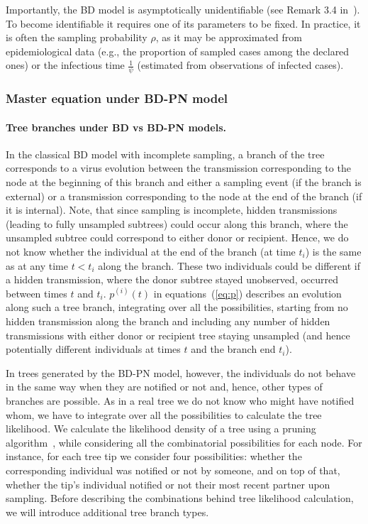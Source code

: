 \documentclass[10pt,letterpaper]{article}
\begin{document}
Importantly, the BD model is asymptotically unidentifiable (see Remark 3.4 in~\cite{Stadler2009}). To become identifiable it requires one of its parameters to be fixed. In practice, it is often the sampling probability $\rho$, as it may be approximated from epidemiological data (e.g., the proportion of sampled cases among the declared ones) or the infectious time $\frac{1}{\psi}$ (estimated from observations of infected cases). 

\subsubsection*{Master equation under BD-PN model}

\paragraph{Tree branches under BD vs BD-PN models.}

In the classical BD model with incomplete sampling, a branch of the tree corresponds to a virus evolution between the transmission corresponding to the node at the beginning of this branch and either a sampling event (if the branch is external) or a transmission corresponding to the node at the end of the branch (if it is internal). Note, that since sampling is incomplete, hidden transmissions (leading to fully unsampled subtrees) could occur along this branch, where the unsampled subtree could correspond to either donor or recipient.  Hence, we do not know whether the individual at the end of the branch (at time $t_i$) is the same as at any time $t < t_i$ along the branch. These two individuals could be different if a hidden transmission, where the donor subtree stayed unobserved, occurred between times $t$ and $t_i$. $p^{(i)}(t)$ in equations~(\ref{eq:p}) describes an evolution along such a tree branch, integrating over all the possibilities, starting from no hidden transmission along the branch and including any number of hidden transmissions with either donor or recipient tree staying unsampled (and hence potentially different individuals at times $t$ and the branch end $t_i$).

In trees generated by the BD-PN model, however, the individuals do not behave in the same way when they are notified or not and, hence, other types of branches are possible. As in a real tree we do not know who might have notified whom, we have to integrate over all the possibilities to calculate the tree likelihood. We calculate the likelihood density of a tree using a pruning algorithm~\cite{10.1093/sysbio/22.3.240}, while considering all the combinatorial possibilities for each node. For instance, for each tree tip we consider four possibilities: whether the corresponding individual was notified or not by someone, and on top of that, whether the tip's individual notified or not their most recent partner upon sampling. Before describing the combinations behind tree likelihood calculation, we will introduce additional tree branch types.
\end{document}
